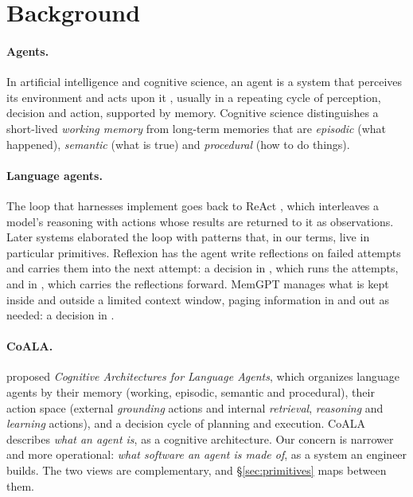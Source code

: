 \section{Background}
\label{sec:background}

\paragraph{Agents.} In artificial intelligence and cognitive science, an agent is a system that perceives its environment and acts upon it \citep{russell2020aima}, usually in a repeating cycle of perception, decision and action, supported by memory. Cognitive science distinguishes a short-lived \emph{working memory} from long-term memories that are \emph{episodic} (what happened), \emph{semantic} (what is true) and \emph{procedural} (how to do things).

\paragraph{Language agents.} The loop that harnesses implement goes back to ReAct \citep{yao2023react}, which interleaves a model's reasoning with actions whose results are returned to it as observations. Later systems elaborated the loop with patterns that, in our terms, live in particular primitives. Reflexion \citep{shinn2023reflexion} has the agent write reflections on failed attempts and carries them into the next attempt: a decision in , which runs the attempts, and in , which carries the reflections forward. MemGPT \citep{packer2023memgpt} manages what is kept inside and outside a limited context window, paging information in and out as needed: a decision in .

\paragraph{CoALA.} \citet{sumers2024coala} proposed \emph{Cognitive Architectures for Language Agents}, which organizes language agents by their memory (working, episodic, semantic and procedural), their action space (external \emph{grounding} actions and internal \emph{retrieval}, \emph{reasoning} and \emph{learning} actions), and a decision cycle of planning and execution. CoALA describes \emph{what an agent is}, as a cognitive architecture. Our concern is narrower and more operational: \emph{what software an agent is made of}, as a system an engineer builds. The two views are complementary, and \S\ref{sec:primitives} maps between them.

